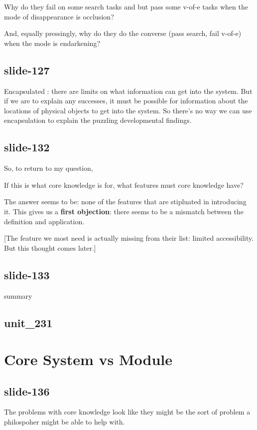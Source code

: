 \documentclass[12pt,\papersize]{extarticle}
\begin{document}
Why do they fail on some search tasks and but pass some v-of-e tasks
when the mode of disappearance is occlusion?

And, equally pressingly, why do they do the converse (pass search, fail v-of-e)
when the mode is endarkening?

\subsection{slide-127}
Encapsulated : there are limits on what information can get into the system.
But if we are to explain any successes, it must be possible for information
about the locations of physical objects to get into the system.
So there’s no way we can use encapsulation to explain the puzzling developmental
findings.

\subsection{slide-132}
So, to return to my question,

If this is what core knowledge is for, what features must core knowledge have?

The answer seems to be: none of the features that are stipluated in introducing it.
This gives us a \textbf{first objection}: there seems to be a mismatch between
the definition and application.

[The feature we most need is actually missing from their list: limited accessibility.
But this thought comes later.]

\subsection{slide-133}
summary

\subsection{unit\_231}


\section{Core System vs Module}

\subsection{slide-136}
The problems with core knowledge look like they might be
the sort of problem a philospoher might be able to help with.
\end{document}

